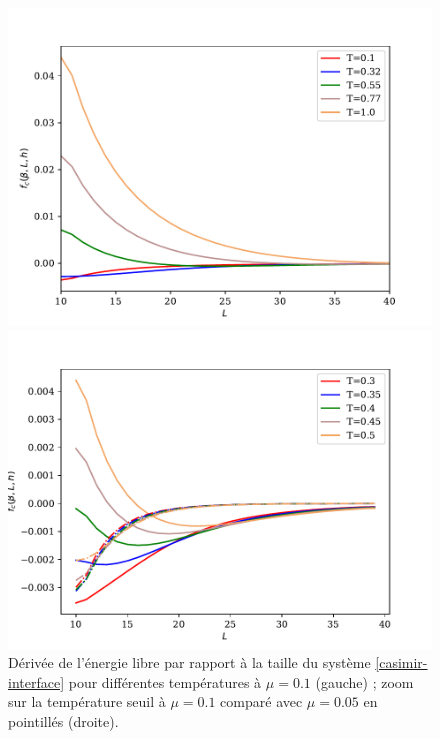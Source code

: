 \begin{figure}
    \begin{minipage}[t]{0.5\linewidth}
        	\includegraphics[width=\linewidth]{chap4/casimir-temperature.pdf}    
    \end{minipage}
    \begin{minipage}[t]{0.5\linewidth}
        	\includegraphics[width=\linewidth]{chap4/casimir-temperature-zoom.pdf}    
    \end{minipage}
	\label{distribution-taille-finie}
	\caption{Dérivée de l'énergie libre par rapport à la taille du système \ref{casimir-interface} pour différentes températures à $\mu=0.1$ (gauche) ; zoom sur la température seuil à $\mu=0.1$ comparé avec $\mu=0.05$ en pointillés (droite). }
\end{figure}


